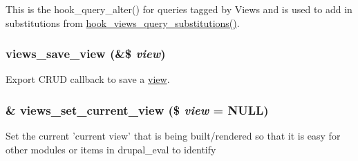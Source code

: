 This is the hook\_\-query\_\-alter() for queries tagged by Views and is used to add in substitutions from \hyperlink{group__views__hooks_gac3628ab1f08eee5a2bd9c3c4b5bd4c3b}{hook\_\-views\_\-query\_\-substitutions()}. \hypertarget{views_8module_a7de4aba561f47e86e405f5519a0d3dfe}{
\subsubsection[{views\_\-save\_\-view}]{\setlength{\rightskip}{0pt plus 5cm}views\_\-save\_\-view (\&\$ {\em view})}}
\label{views_8module_a7de4aba561f47e86e405f5519a0d3dfe}
Export CRUD callback to save a \hyperlink{classview}{view}. \hypertarget{views_8module_af6970f0a92406ed61373aa9ede6b121e}{
\subsubsection[{views\_\-set\_\-current\_\-view}]{\setlength{\rightskip}{0pt plus 5cm}\& views\_\-set\_\-current\_\-view (\$ {\em view} = {\ttfamily NULL})}}
\label{views_8module_af6970f0a92406ed61373aa9ede6b121e}
Set the current 'current view' that is being built/rendered so that it is easy for other modules or items in drupal\_\-eval to identify

